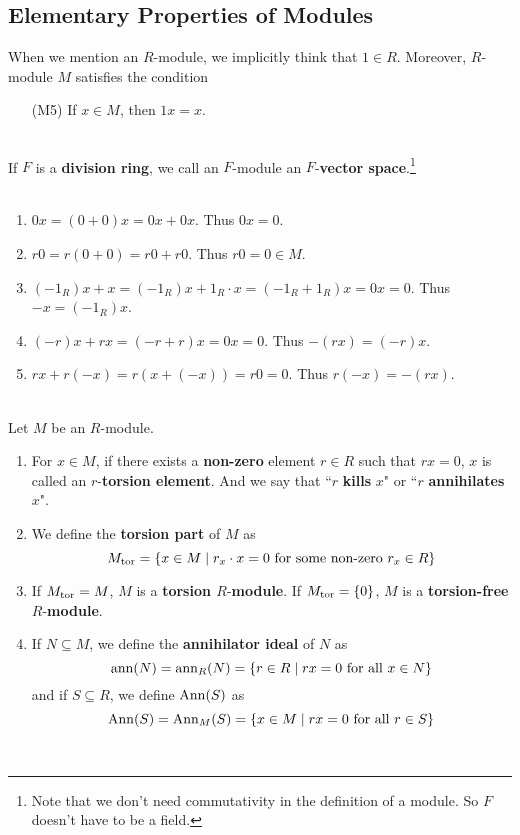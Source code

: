 \subsection{Elementary Properties of Modules}
When we mention an $R$-module, we implicitly think that $1 \in R$. Moreover, $R$-module $M$ satisfies the condition

\begin{enumerate}
	\item[{\sffamily (M5)}] If $x\in M$, then $1x = x$.
\end{enumerate}~
\\
 If $F$ is a \textbf{division ring}, we call an $F$-module an $F$-\textbf{vector space}.\footnote{Note that we don't need commutativity in the definition of a module. So $F$ doesn't have to be a field.}\\
\\
\begin{enumerate}
	\item $0x = (0+0)x = 0x + 0x$. Thus $0x = 0$.
	\item $r0 = r(0+0) = r0 + r0$. Thus $r0 = 0\in M$.
	\item $(-1_R)x + x = (-1_R)x + 1_R\cdot x = (-1_R+1_R)x = 0x = 0$. Thus $-x = (-1_R)x$.
	\item $(-r)x + rx = (-r+r)x = 0x = 0$. Thus $-(rx) = (-r)x$.
	\item $rx + r(-x) = r(x + (-x)) = r0 = 0$. Thus $r(-x) = -(rx)$.
\end{enumerate}~
\\
 Let $M$ be an $R$-module.
\begin{enumerate}
	\item For $x\in M$, if there exists a \textbf{non-zero} element $r\in R$ such that $rx = 0$, $x$ is called an $r$-\textbf{torsion element}. And we say that ``$r$ \textbf{kills} $x$" or ``$r$ \textbf{annihilates} $x$".
	\item We define the \textbf{torsion part} of $M$ as $$M_{\text{tor}} = \{x\in M \mid r_x\cdot x = 0 \text{ for some non-zero } r_x\in R\}$$
	\item If $M_{\text{tor}} = M$, $M$ is a \textbf{torsion $R$}-\textbf{module}. If $M_{\text{tor}} = \{0\}$, $M$ is a \textbf{torsion-free $R$}-\textbf{module}.
	\item If $N\subseteq M$, we define the \textbf{annihilator ideal} of $N$ as
	$$\operatorname{ann}(N) = \operatorname{ann}_R(N) = \{r\in R\mid rx = 0 \text{ for all } x\in N\}$$
	and if $S\subseteq R$, we define $\operatorname{Ann}(S)$ as
	$$\operatorname{Ann}(S) = \operatorname{Ann}_M(S) = \{x\in M \mid rx = 0 \text{ for all }r\in S\}$$
\end{enumerate}~
